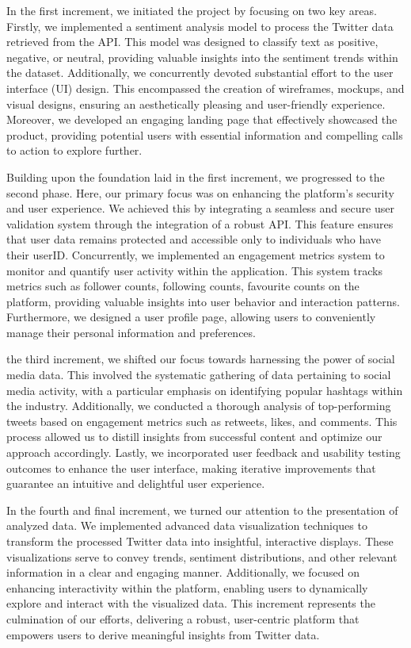 \documentclass[a4paper,12pt]{article}
\begin{document}
{{{								
In the first increment, we initiated the project by focusing on two key areas. Firstly, we implemented a sentiment analysis model to process the Twitter data retrieved from the API. This model was designed to classify text as positive, negative, or neutral, providing valuable insights into the sentiment trends within the dataset. Additionally, we concurrently devoted substantial effort to the user interface (UI) design. This encompassed the creation of wireframes, mockups, and visual designs, ensuring an aesthetically pleasing and user-friendly experience. Moreover, we developed an engaging landing page that effectively showcased the product, providing potential users with essential information and compelling calls to action to explore further.


 Building upon the foundation laid in the first increment, we progressed to the second phase. Here, our primary focus was on enhancing the platform's security and user experience. We achieved this by integrating a seamless and secure user validation system through the integration of a robust API. This feature ensures that user data remains protected and accessible only to individuals who have their userID. Concurrently, we implemented an engagement metrics system to monitor and quantify user activity within the application. This system tracks metrics such as follower counts, following counts, favourite counts on the platform, providing valuable insights into user behavior and interaction patterns. Furthermore, we designed a user profile page, allowing users to conveniently manage their personal information and preferences.

 the third increment, we shifted our focus towards harnessing the power of social media data. This involved the systematic gathering of data pertaining to social media activity, with a particular emphasis on identifying popular hashtags within the industry. Additionally, we conducted a thorough analysis of top-performing tweets based on engagement metrics such as retweets, likes, and comments. This process allowed us to distill insights from successful content and optimize our approach accordingly. Lastly, we incorporated user feedback and usability testing outcomes to enhance the user interface, making iterative improvements that guarantee an intuitive and delightful user experience.


 In the fourth and final increment, we turned our attention to the presentation of analyzed data. We implemented advanced data visualization techniques to transform the processed Twitter data into insightful, interactive displays. These visualizations serve to convey trends, sentiment distributions, and other relevant information in a clear and engaging manner. Additionally, we focused on enhancing interactivity within the platform, enabling users to dynamically explore and interact with the visualized data. This increment represents the culmination of our efforts, delivering a robust, user-centric platform that empowers users to derive meaningful insights from Twitter data.




}}}
\end{document}
